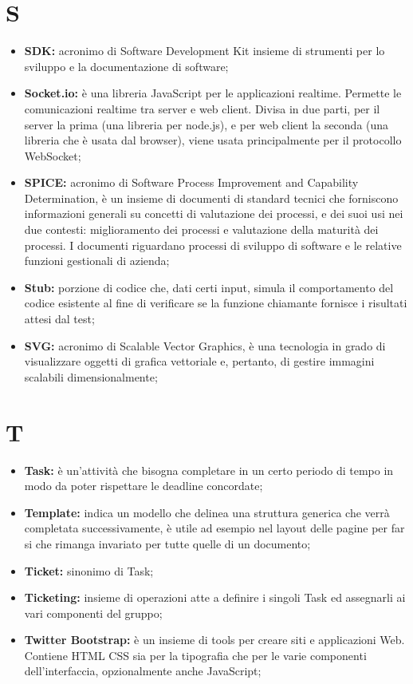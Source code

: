 \section*{S} %
\label{sec:s}
	\begin{itemize}
		\item \textbf{SDK:} acronimo di Software Development Kit insieme di strumenti per lo sviluppo e la documentazione di software;	
		\item \textbf{Socket.io:} è una libreria JavaScript per le applicazioni realtime. Permette le comunicazioni realtime tra server e web client. Divisa in due parti, per il server la prima (una libreria per node.js), e per web client la seconda (una libreria che è usata dal browser), viene usata principalmente per il protocollo WebSocket;
		\item \textbf{SPICE:} acronimo di Software Process Improvement and Capability Determination, è un insieme di documenti di standard tecnici che forniscono informazioni generali su concetti di valutazione dei processi, e dei suoi usi nei due contesti: miglioramento dei processi e valutazione della maturità dei processi. I documenti riguardano processi di sviluppo di software e le relative funzioni gestionali di azienda;
		\item \textbf{Stub:} porzione di codice che, dati certi input, simula il comportamento del codice esistente al fine di verificare se la funzione chiamante fornisce i risultati attesi dal test;	
		\item \textbf{SVG:} acronimo di Scalable Vector Graphics, è una tecnologia in grado di visualizzare oggetti di grafica vettoriale e, pertanto, di gestire immagini scalabili dimensionalmente;
	\end{itemize}
\pagebreak

\section*{T} %
\label{sec:t}
	\begin{itemize}
		\item \textbf{Task:} è un'attività che bisogna completare in un certo periodo di tempo in modo da poter rispettare le deadline concordate;
		\item \textbf{Template:} indica un modello che delinea una struttura generica che verrà completata successivamente, è utile ad esempio nel layout delle pagine per far si che rimanga invariato per tutte quelle di un documento;
		\item \textbf{Ticket:} sinonimo di Task;
		\item \textbf{Ticketing:} insieme di operazioni atte a definire i singoli Task ed assegnarli ai vari componenti del gruppo; 		
		\item \textbf{Twitter Bootstrap:} è un insieme di tools per creare siti e applicazioni Web. Contiene HTML CSS sia per la tipografia che per le varie componenti dell'interfaccia, opzionalmente anche JavaScript;
		
	\end{itemize}
\pagebreak
